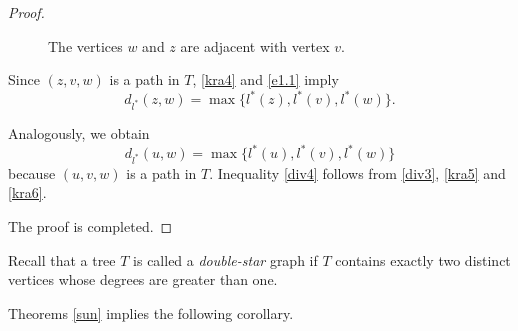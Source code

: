 \documentclass[11pt]{article}
\theoremstyle{definition}
\theoremstyle{remark}
\numberwithin{equation}{section}
\begin{document}
\begin{proof}
\begin{figure}[H]
\centering
\begin{center}
\end{center}
\caption{The vertices $w$ and $z$ are adjacent with vertex $v$.}
\label{far4}
\end{figure}



Since $(z,v,w) $ is a path in $T$, \eqref{kra4} and \eqref{e1.1} imply 
\begin{equation}
    \label{kra5}
    d_{l^*}(z,w)=\max\{l^*( z),l^*(v),l^*(w)\}.
\end{equation}



Analogously, we obtain
\begin{equation}
    \label{kra6}
    d_{l^*}(u,w)=\max\{l^*( u),l^*(v),l^*(w)\}
\end{equation}
because $(u, v, w)$ is a path in $T$.
Inequality \eqref{div4} follows from \eqref{div3}, \eqref{kra5} and \eqref{kra6}.


The proof is completed. 


\end{proof}







Recall that a tree $T$ is called a \textit{double-star} graph if $T$ contains exactly two distinct vertices whose degrees are greater than one.

Theorems \ref{sun} implies the following corollary. 
\end{document}
